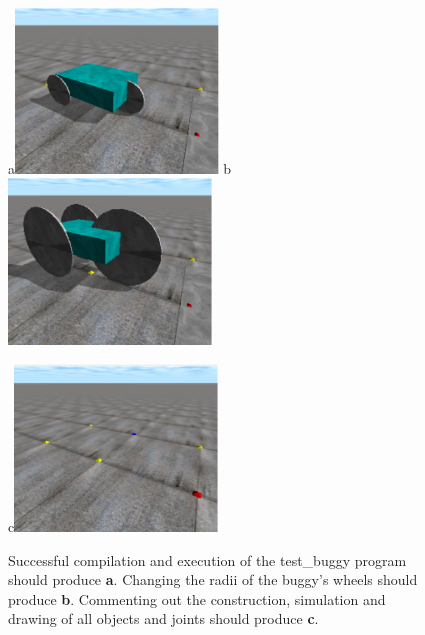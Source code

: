 \documentclass[12pt]{article}
\begin{document}
\begin{figure}[!t]
\centerline{
a\includegraphics[width=0.48\textwidth]{Fig1a.eps}
b\includegraphics[width=0.48\textwidth]{Fig1b.eps}
}
\centerline{
c\includegraphics[width=0.48\textwidth]{Fig1c.eps}
}
\caption{
Successful compilation and execution of the test\_buggy program should produce \textbf{a}.
Changing the radii of the buggy's wheels should produce \textbf{b}.
Commenting out the construction, simulation and drawing of all objects and joints should produce \textbf{c}.}
\label{Fig}
\end{figure}
\end{document}
